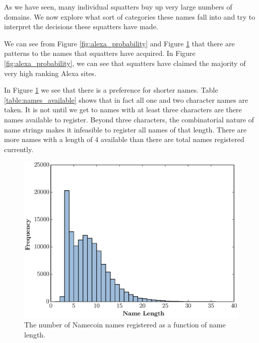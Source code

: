 As we have seen, many individual squatters buy up very large numbers of domains. We now explore what sort of categories these names fall into and try to interpret the decisions these squatters have made.

We can see from Figure \ref{fig:alexa_probability} and Figure \ref{fig:name_length_histogram} that there are patterns to the names that squatters have acquired. In Figure \ref{fig:alexa_probability}, we can see that squatters have claimed the majority of very high ranking Alexa sites.

In Figure \ref{fig:name_length_histogram} we see that there is a preference for shorter names. Table \ref{table:names_available} shows that in fact all one and two character names are taken. It is not until we get to names with at least three characters are there names available to register. Beyond three characters, the combinatorial nature of name strings makes it infeasible to register all names of that length. There are more names with a length of 4 available than there are total names registered currently.


\begin{figure}
  \centering
  \includegraphics[width=\columnwidth]{figures/name_length_histogram}
  \caption{The number of Namecoin names registered as a function of name length.}
  \label{fig:name_length_histogram}
\end{figure}

